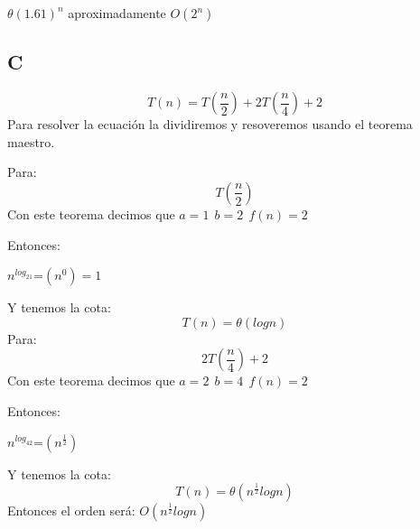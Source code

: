 \documentclass[12pt, fleqn]{article}                             %
\theoremstyle{break}                                            %
\begin{document}
    $\theta(1.61)^n$ aproximadamente $O(2^n)$

    \subsection{C}
    \begin{equation*}
        T(n)=T(\dfrac{n}{2})+2T(\dfrac{n}{4})+2
    \end{equation*}
    Para resolver la ecuación la dividiremos y resoveremos usando el teorema maestro.

    Para:
    \begin{equation*}
        T(\dfrac{n}{2})
    \end{equation*}
    Con este teorema decimos que $a=1\:\:b=2\:\:f(n)=2$

    Entonces:


    $n^{log_21}$=$(n^0)=1$

    Y tenemos la cota:
    \begin{equation*}
        T(n)=\theta(logn)
    \end{equation*}
    Para:
    \begin{equation*}
        2T(\dfrac{n}{4})+2
    \end{equation*}
    Con este teorema decimos que $a=2\:\:b=4\:\:f(n)=2$

    Entonces:


    $n^{log_42}$=$(n^{\frac{1}{2}})$

    Y tenemos la cota:
    \begin{equation*}
        T(n)=\theta(n^{\frac{1}{2}}logn)
    \end{equation*}
    Entonces el orden será:
    $O(n^{\frac{1}{2}}logn)$

    
\end{document}
